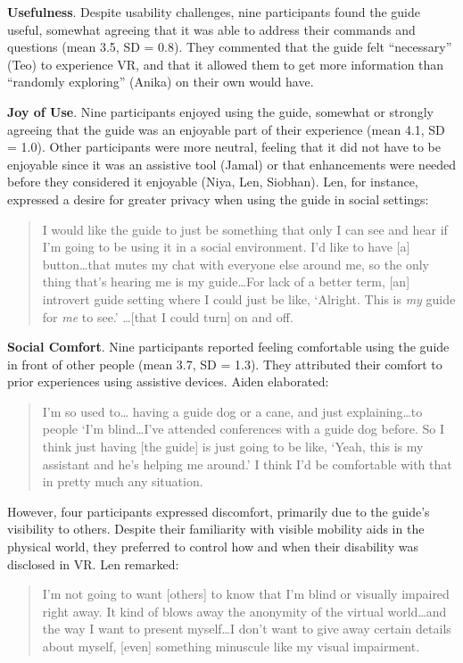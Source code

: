 \textbf{Usefulness}. Despite usability challenges, nine participants found the guide useful, somewhat agreeing that it was able to address their commands and questions (mean 3.5, SD = 0.8). They commented that the guide felt “necessary” (Teo) to experience VR, and that it allowed them to get more information than “randomly exploring” (Anika) on their own would have.

\textbf{Joy of Use}. Nine participants enjoyed using the guide, somewhat or strongly agreeing that the guide was an enjoyable part of their experience (mean 4.1, SD = 1.0). Other participants were more neutral, feeling that it did not have to be enjoyable since it was an assistive tool (Jamal) or that enhancements were needed before they considered it enjoyable (Niya, Len, Siobhan). Len, for instance, expressed a desire for greater privacy when using the guide in social settings:

\begin{quote}
I would like the guide to just be something that only I can see and hear if I'm going to be using it in a social environment. I'd like to have [a] button…that mutes my chat with everyone else around me, so the only thing that's hearing me is my guide…For lack of a better term, [an] introvert guide setting where I could just be like, ‘Alright. This is \textit{my} guide for \textit{me} to see.’ …[that I could turn] on and off.
\end{quote}

\textbf{Social Comfort}. Nine participants reported feeling comfortable using the guide in front of other people (mean 3.7, SD = 1.3). They attributed their comfort to prior experiences using assistive devices. Aiden elaborated: 

\begin{quote}
I'm so used to… having a guide dog or a cane, and just explaining…to people ‘I'm blind…I've attended conferences with a guide dog before. So I think just having [the guide] is just going to be like, ‘Yeah, this is my assistant and he's helping me around.’ I think I'd be comfortable with that in pretty much any situation.
\end{quote}

However, four participants expressed discomfort, primarily due to the guide's visibility to others. Despite their familiarity with visible mobility aids in the physical world, they preferred to control how and when their disability was disclosed in VR. Len remarked:

\begin{quote}
I'm not going to want [others] to know that I'm blind or visually impaired right away. It kind of blows away the anonymity of the virtual world…and the way I want to present myself…I don't want to give away certain details about myself, [even] something minuscule like my visual impairment.
\end{quote}


